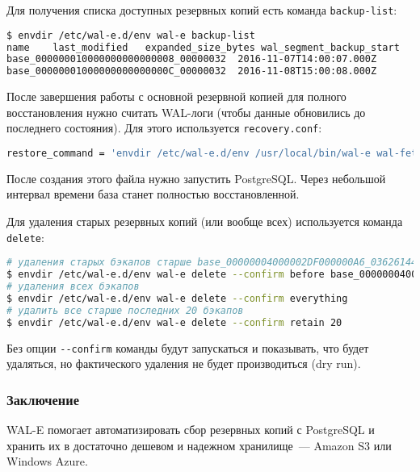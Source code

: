 Для получения списка доступных резервных копий есть команда \lstinline!backup-list!:

\begin{lstlisting}[language=Bash,label=lst:wal-e12,caption=Список резервных копий]
$ envdir /etc/wal-e.d/env wal-e backup-list
name	last_modified	expanded_size_bytes	wal_segment_backup_start	wal_segment_offset_backup_start	wal_segment_backup_stop	wal_segment_offset_backup_stop
base_000000010000000000000008_00000032	2016-11-07T14:00:07.000Z		000000010000000000000008	00000032
base_00000001000000000000000C_00000032	2016-11-08T15:00:08.000Z		00000001000000000000000C	00000032
\end{lstlisting}

После завершения работы с основной резервной копией для полного восстановления нужно считать WAL-логи (чтобы данные обновились до последнего состояния). Для этого используется \lstinline!recovery.conf!:

\begin{lstlisting}[language=Bash,label=lst:wal-e13,caption=recovery.conf]
restore_command = 'envdir /etc/wal-e.d/env /usr/local/bin/wal-e wal-fetch "%f" "%p"'
\end{lstlisting}

После создания этого файла нужно запустить PostgreSQL. Через небольшой интервал времени база станет полностью восстановленной.

Для удаления старых резервных копий (или вообще всех) используется команда \lstinline!delete!:

\begin{lstlisting}[language=Bash,label=lst:wal-e14,caption=Удаление резервных копий]
# удаления старых бэкапов старше base_00000004000002DF000000A6_03626144
$ envdir /etc/wal-e.d/env wal-e delete --confirm before base_00000004000002DF000000A6_03626144
# удаления всех бэкапов
$ envdir /etc/wal-e.d/env wal-e delete --confirm everything
# удалить все старше последних 20 бэкапов
$ envdir /etc/wal-e.d/env wal-e delete --confirm retain 20
\end{lstlisting}

Без опции \lstinline!--confirm! команды будут запускаться и показывать, что будет удаляться, но фактического удаления не будет производиться (dry run).

\subsubsection{Заключение}

WAL-E помогает автоматизировать сбор резервных копий с PostgreSQL и хранить их в достаточно дешевом и надежном хранилище~--- Amazon S3 или Windows Azure.
